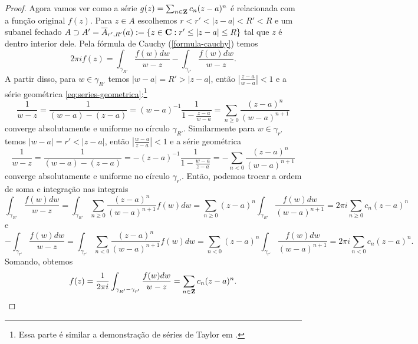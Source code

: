 \begin{proof}
Agora vamos ver como a série $g(z) = \sum_{n\in\mathbf{Z}} c_n (z-a)^n$ é relacionada com a função original $f(z)$.
Para $z\in A$ escolhemos $r<r'<|z-a|<R'<R$ e um subanel fechado
$A \supset A'= \overline{A}_{r',R'}(a) := \{ z\in\mathbf{C} : r'\leq|z-a|\leq R\}$
tal que $z$ é dentro interior dele.
Pela fórmula de Cauchy (\cref{formula-cauchy}) temos
\[ 2\pi i f(z) = \int_{\gamma_{R'}} \frac{f(w)dw}{w-z} - \int_{\gamma_{r'}} \frac{f(w)dw}{w-z}. \]
A partir disso, para $w\in\gamma_{R'}$
temos $|w-a| = R' > |z-a|$, então $|\frac{z-a}{w-a}|<1$
e a série geométrica \eqref{eq:series-geometrica}:\footnote{
Essa parte é similar a demonstração de séries de Taylor em .}
\begin{equation*}
 \frac{1}{w-z} = \frac{1}{(w-a)-(z-a)} = (w-a)^{-1} \frac1{1-\frac{z-a}{w-a}}
= \sum_{n\geq 0} \frac{(z-a)^n}{(w-a)^{n+1}}
\end{equation*}
converge absolutamente e uniforme no círculo $\gamma_{R'}$.
Similarmente para $w\in\gamma_{r'}$
temos $|w-a| = r' < |z-a|$, então $|\frac{w-a}{z-a}|<1$
e a série geométrica 
\begin{equation*}
 \frac{1}{w-z} = \frac{1}{(w-a)-(z-a)} = -(z-a)^{-1} \frac1{1-\frac{w-a}{z-a}}
= - \sum_{n<0} \frac{(z-a)^n}{(w-a)^{n+1}}
\end{equation*}
converge absolutamente e uniforme no círculo $\gamma_{r'}$.
Então, podemos trocar a ordem de soma e integração nas integrais
\[ \int_{\gamma_{R'}} \frac{f(w)dw}{w-z}
  = \int_{\gamma_{R'}} \sum_{n\geq 0} \frac{(z-a)^n}{(w-a)^{n+1}} f(w) dw
  = \sum_{n\geq 0} (z-a)^n \int_{\gamma_{R'}} \frac{f(w)dw}{(w-a)^{n+1}}
  = 2\pi i \sum_{n\geq 0} c_n (z-a)^n \]
e
\[ -\int_{\gamma_{r'}} \frac{f(w)dw}{w-z}
  = \int_{\gamma_{r'}} \sum_{n<0} \frac{(z-a)^n}{(w-a)^{n+1}} f(w) dw
  = \sum_{n<0} (z-a)^n \int_{\gamma_{r'}} \frac{f(w)dw}{(w-a)^{n+1}}
  = 2\pi i \sum_{n<0} c_n (z-a)^n. \]
Somando, obtemos
\[ f(z) = \frac{1}{2\pi i} \int_{\gamma_{R'}-\gamma_{r'}} \frac{f(w)dw}{w-z} 
        = \sum_{n\in\mathbf{Z}} c_n (z-a)^n. \]

\end{proof}

